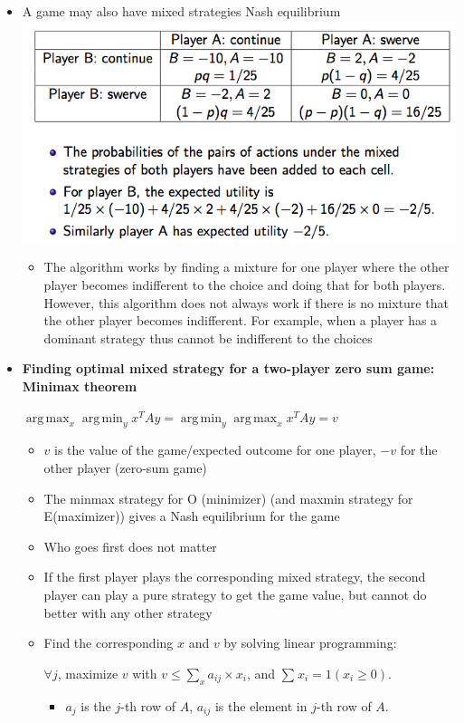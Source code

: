 \documentclass[12pt]{article}
\begin{document}
\begin{itemize}
\item A game may also have mixed strategies Nash equilibrium\\

 \includegraphics[scale=0.5]{p2}
\begin{itemize}
\item The algorithm works by finding a mixture for one player where the other player becomes indifferent to the choice and doing that for both players. However, this algorithm does not always work if there is no mixture that the other player becomes indifferent. For example, when a player has a dominant strategy thus cannot be indifferent to the choices
\end{itemize}

\item \textbf{Finding optimal mixed strategy for a two-player zero sum game: Minimax theorem }
\begin{tcolorbox}
$\operatorname*{arg\,max}_x \operatorname*{arg\,min}_y x^TAy = \operatorname*{arg\,min}_y \operatorname*{arg\,max}_x x^TAy = v$ 
\end{tcolorbox}
\begin{itemize}
\item $v$ is the value of the game/expected outcome for one player, $-v$ for the other player (zero-sum game)
\item The minmax strategy for O (minimizer) (and maxmin strategy for E(maximizer)) gives a Nash equilibrium for the game
\item Who goes first does not matter
\item If the first player plays the corresponding mixed strategy, the second player can play a pure strategy to get the game value, but cannot do better with any other strategy
\item Find the corresponding $x$ and $v$ by solving linear programming: 

$ \forall j$, maximize $v$ with $v \leq \sum_{x}^{} a_{ij} \times x_i$, and $\sum_{}^{} x_i = 1(x_i \geq 0) $.
\begin{itemize}
\item $a_{j}$ is the $j$-th row of $A$, $a_{ij}$ is the element in $j$-th row of $A$.
\end{itemize}
\end{itemize}

\end{itemize}
\end{document}
